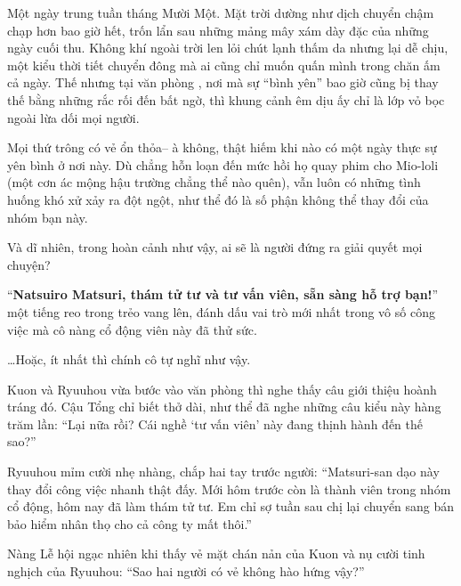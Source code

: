 \documentclass[../main.tex]{subfiles}
\begin{document}

Một ngày trung tuần tháng Mười Một. Mặt trời dường như dịch chuyển chậm chạp hơn bao giờ hết, trốn lẩn sau những mảng mây xám dày đặc của những ngày cuối thu. Không khí ngoài trời len lỏi chút lạnh thấm da nhưng lại dễ chịu, một kiểu thời tiết chuyển đông mà ai cũng chỉ muốn quấn mình trong chăn ấm cả ngày. Thế nhưng tại văn phòng \hll, nơi mà sự ``bình yên'' bao giờ cũng bị thay thế bằng những rắc rối đến bất ngờ, thì khung cảnh êm dịu ấy chỉ là lớp vỏ bọc ngoài lừa dối mọi người.

Mọi thứ trông có vẻ ổn thỏa-- à không, thật hiếm khi nào có một ngày thực sự yên bình ở nơi này. Dù chẳng hỗn loạn đến mức hồi họ quay phim cho Mio-loli (một cơn ác mộng hậu trường chẳng thể nào quên), vẫn luôn có những tình huống khó xử xảy ra đột ngột, như thể đó là số phận không thể thay đổi của nhóm bạn này.

Và dĩ nhiên, trong hoàn cảnh như vậy, ai sẽ là người đứng ra giải quyết mọi chuyện?

``\textbf{Natsuiro Matsuri, thám tử tư và tư vấn viên, sẵn sàng hỗ trợ bạn!}'' một tiếng reo trong trẻo vang lên, đánh dấu vai trò mới nhất trong vô số công việc mà cô nàng cổ động viên này đã thử sức.


\dots Hoặc, ít nhất thì chính cô tự nghĩ như vậy.

Kuon và Ryuuhou vừa bước vào văn phòng thì nghe thấy câu giới thiệu hoành tráng đó. Cậu Tổng chỉ biết thở dài, như thể đã nghe những câu kiểu này hàng trăm lần: ``Lại nữa rồi? Cái nghề `tư vấn viên' này đang thịnh hành đến thế sao?''

Ryuuhou mỉm cười nhẹ nhàng, chắp hai tay trước người: ``Matsuri-san dạo này thay đổi công việc nhanh thật đấy. Mới hôm trước còn là thành viên trong nhóm cổ động, hôm nay đã làm thám tử tư. Em chỉ sợ tuần sau chị lại chuyển sang bán bảo hiểm nhân thọ cho cả công ty mất thôi.''

Nàng Lễ hội ngạc nhiên khi thấy vẻ mặt chán nản của Kuon và nụ cười tinh nghịch của Ryuuhou: ``Sao hai người có vẻ không hào hứng vậy?''
\end{document}
